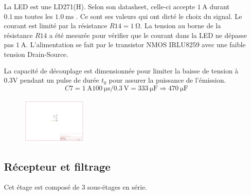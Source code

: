 \documentclass[french]{layout/Report}
\begin{document}
La LED est une LD271(H). Selon son datasheet, celle-ci accepte $\SI{1}{\ampere}$ durant $\SI{0.1}{\milli\second}$ toutes les $\SI{1.0}{\milli\second}$ \cite{LD271(H)}.
Ce sont ses valeurs qui ont dicté le choix du signal.
Le courant est limité par la résistance $\mathit{R14} = \SI{1}{\ohm}$.
La tension au borne de la résistance $\mathit{R14}$ a été mesurée pour vérifier que le courant dans la LED ne dépasse pas $\SI{1}{\ampere}$.
L'alimentation se fait par le transistor NMOS IRLU8259\cite{IRLU8259} avec une faible tension Drain-Source.

La capacité de découplage est dimensionnée pour limiter la baisse de tension à 0.3V pendant un pulse de durée $t_0$ pour assurer la puissance de l'émission.
\begin{equation*}
C7 = \SI{1}{\ampere}\SI{100}{\micro\second}/\SI{0.3}{\volt} = \SI{333}{\micro\farad} \Rightarrow \SI{470}{\micro\farad}
\end{equation*}

\begin{figure}[h]
\centering
\includegraphics[width=0.3\textwidth]{fig/ir_led.pdf}
\end{figure}


\subsection{Récepteur et filtrage}
Cet étage est composé de 3 sous-étages en série.
\end{document}
